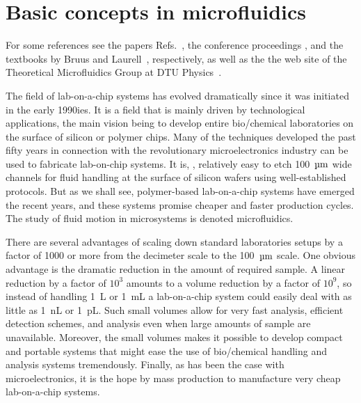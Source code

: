 



\chapter{Basic concepts in microfluidics}

For some references see the papers
Refs.~\cite{Barnkob2010, Augustsson2011, Muller2012, Settnes2012, Karlsen2015}, the conference
proceedings \cite{Augustsson2010, Barnkob2010a, Jensen2013}, and the textbooks by Bruus and Laurell~\cite{Bruus2008, Laurell2014}, respectively, as well as the the web site of the Theoretical Microfluidics Group at DTU Physics~\cite{TMF2015}.

The field of lab-on-a-chip systems  has evolved dramatically since
it was initiated in the early 1990ies. It is a field that is
mainly driven by technological applications, the main vision being
to develop entire bio/chemical laboratories on the surface of
silicon or polymer chips. Many of the techniques developed the past fifty years in
connection with the revolutionary microelectronics industry can be
used to fabricate lab-on-chip systems. It is, \eg, relatively easy
to etch 100~$\SImum$ wide channels for fluid handling at the
surface of silicon wafers using well-established protocols. But as
we shall see, polymer-based lab-on-a-chip systems have emerged the
recent years, and these systems promise cheaper and faster
production cycles. The study of fluid motion in microsystems is
denoted microfluidics.



There are several advantages of scaling down standard laboratories
setups by a factor of 1000 or more from the decimeter scale to the
100~$\SImum$ scale. One obvious advantage is the dramatic
reduction in the amount of required sample. A linear reduction by
a factor of $10^3$ amounts to a volume reduction by a factor of
$10^9$, so instead of handling 1~L or 1~mL a lab-on-a-chip system
could easily deal with as little as 1~nL or 1~pL. Such small
volumes allow for very fast analysis, efficient detection schemes,
and analysis even when large amounts of sample are unavailable.
Moreover, the small volumes makes it possible to develop compact
and portable systems that might ease the use of bio/chemical
handling and analysis systems tremendously. Finally, as has been
the case with microelectronics, it is the hope by mass production
to manufacture very cheap lab-on-a-chip systems.

